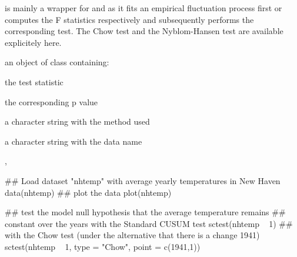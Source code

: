 \begin{Details}\relax
{} is mainly a wrapper for 
and  as it fits an empirical fluctuation process
first or computes the F statistics respectively and subsequently performs the
corresponding test. The Chow test and the Nyblom-Hansen test are available explicitely here.\end{Details}
\begin{Value}
an object of class  containing:
\begin{ldescription}
\item[\code{statistic}] the test statistic
\item[\code{p.value}] the corresponding p value
\item[\code{method}] a character string with the method used
\item[\code{data.name}] a character string with the data name
\end{ldescription}
\end{Value}
\begin{SeeAlso}\relax
{}, \end{SeeAlso}
\begin{Examples}
\begin{ExampleCode}
## Load dataset "nhtemp" with average yearly temperatures in New Haven
data(nhtemp)
## plot the data
plot(nhtemp)

## test the model null hypothesis that the average temperature remains
## constant over the years with the Standard CUSUM test
sctest(nhtemp ~ 1)
## with the Chow test (under the alternative that there is a change 1941)
sctest(nhtemp ~ 1, type = "Chow", point = c(1941,1))
\end{ExampleCode}
\end{Examples}

